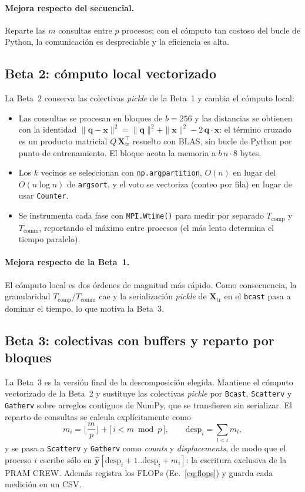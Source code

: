 \documentclass[11pt,a4paper]{article}
\newcommand{\ntr}{n}   %
\newcommand{\mte}{m}   %
\newcommand{\Xtr}{\mathbf{X}_{\text{tr}}}
\newcommand{\yhat}{\hat{\mathbf{y}}}
\newcommand{\Tcomp}{T_{\text{comp}}}
\newcommand{\Tcomm}{T_{\text{comm}}}
\begin{document}
\paragraph{Mejora respecto del secuencial.} Reparte las $\mte$ consultas entre $p$ procesos; con el
cómputo tan costoso del bucle de Python, la comunicación es despreciable y la eficiencia es alta.

\subsection{Beta 2: cómputo local vectorizado}
La Beta~2 conserva las colectivas \emph{pickle} de la Beta~1 y cambia el cómputo local:
\begin{itemize}
  \item Las consultas se procesan en bloques de $b=256$ y las distancias se obtienen con la identidad
        $\|\mathbf{q}-\mathbf{x}\|^2=\|\mathbf{q}\|^2+\|\mathbf{x}\|^2-2\,\mathbf{q}\cdot\mathbf{x}$:
        el término cruzado es un producto matricial $Q\,\Xtr^{\top}$ resuelto con BLAS, sin bucle de
        Python por punto de entrenamiento. El bloque acota la memoria a $b\,\ntr\cdot8$ bytes.
  \item Los $k$ vecinos se seleccionan con \texttt{np.argpartition}, $O(n)$ en lugar del
        $O(n\log n)$ de \texttt{argsort}, y el voto se vectoriza (conteo por fila) en lugar de usar
        \texttt{Counter}.
  \item Se instrumenta cada fase con \texttt{MPI.Wtime()} para medir por separado $\Tcomp$ y $\Tcomm$,
        reportando el máximo entre procesos (el más lento determina el tiempo paralelo).
\end{itemize}

\paragraph{Mejora respecto de la Beta~1.} El cómputo local es dos órdenes de magnitud más rápido.
Como consecuencia, la granularidad $\Tcomp/\Tcomm$ cae y la serialización \emph{pickle} de $\Xtr$ en
el \texttt{bcast} pasa a dominar el tiempo, lo que motiva la Beta~3.

\subsection{Beta 3: colectivas con buffers y reparto por bloques}
La Beta~3 es la versión final de la descomposición elegida. Mantiene el cómputo vectorizado de la
Beta~2 y sustituye las colectivas \emph{pickle} por \texttt{Bcast}, \texttt{Scatterv} y
\texttt{Gatherv} sobre arreglos contiguos de NumPy, que se transfieren sin serializar. El reparto
de consultas se calcula explícitamente como
\begin{equation}
  m_i=\Big\lfloor\frac{\mte}{p}\Big\rfloor+\big[\,i<\mte\bmod p\,\big],\qquad
  \mathrm{desp}_i=\sum_{l<i}m_l ,\label{eq:bloques}
\end{equation}
y se pasa a \texttt{Scatterv} y \texttt{Gatherv} como \emph{counts} y \emph{displacements}, de modo
que el proceso $i$ escribe sólo en $\yhat[\mathrm{desp}_i+1..\mathrm{desp}_i+m_i]$: la escritura
exclusiva de la PRAM CREW. Además registra los FLOPs (Ec.~\eqref{eq:flops}) y guarda cada medición
en un CSV.
\end{document}
